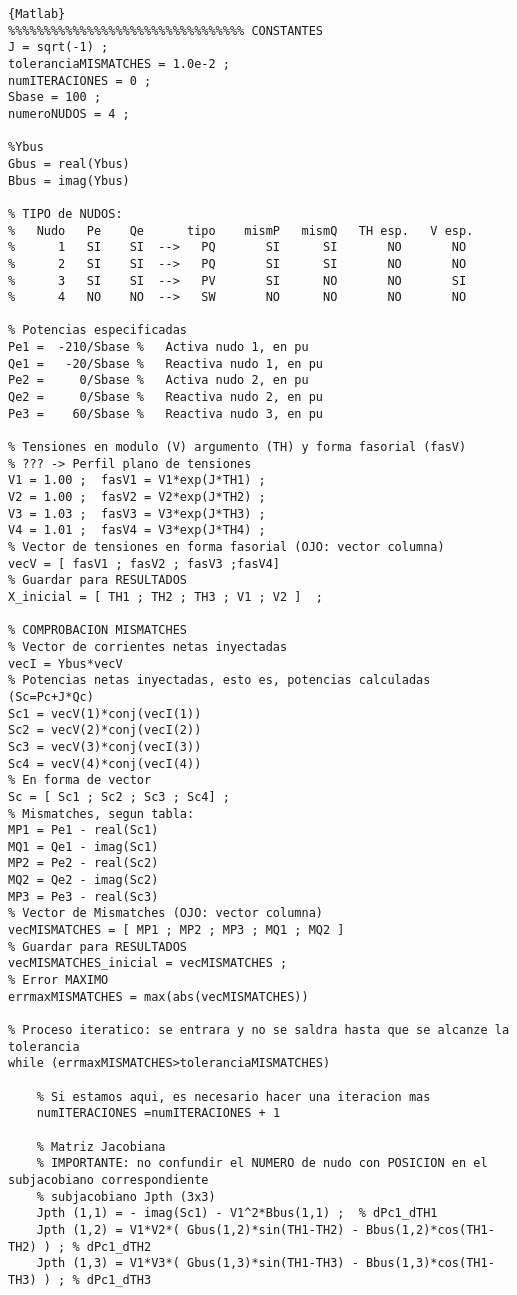 \documentclass[a4paper,10pt,titlepage,oneside]{article}
\begin{document}
{\begin{lstlisting}[frame=lines]{Matlab}
%%%%%%%%%%%%%%%%%%%%%%%%%%%%%%%%% CONSTANTES
J = sqrt(-1) ;
toleranciaMISMATCHES = 1.0e-2 ;
numITERACIONES = 0 ;
Sbase = 100 ;
numeroNUDOS = 4 ;

%Ybus
Gbus = real(Ybus)
Bbus = imag(Ybus)

% TIPO de NUDOS:
%   Nudo   Pe    Qe      tipo    mismP   mismQ   TH esp.   V esp.
%      1   SI    SI  -->   PQ       SI      SI       NO       NO
%      2   SI    SI  -->   PQ       SI      SI       NO       NO
%      3   SI    SI  -->   PV       SI      NO       NO       SI
%      4   NO    NO  -->   SW       NO      NO       NO       NO

% Potencias especificadas
Pe1 =  -210/Sbase %   Activa nudo 1, en pu
Qe1 =   -20/Sbase %   Reactiva nudo 1, en pu
Pe2 =     0/Sbase %   Activa nudo 2, en pu
Qe2 =     0/Sbase %   Reactiva nudo 2, en pu
Pe3 =    60/Sbase %   Reactiva nudo 3, en pu

% Tensiones en modulo (V) argumento (TH) y forma fasorial (fasV)
% ??? -> Perfil plano de tensiones
V1 = 1.00 ;  fasV1 = V1*exp(J*TH1) ;
V2 = 1.00 ;  fasV2 = V2*exp(J*TH2) ;
V3 = 1.03 ;  fasV3 = V3*exp(J*TH3) ;
V4 = 1.01 ;  fasV4 = V3*exp(J*TH4) ;
% Vector de tensiones en forma fasorial (OJO: vector columna)
vecV = [ fasV1 ; fasV2 ; fasV3 ;fasV4]  
% Guardar para RESULTADOS
X_inicial = [ TH1 ; TH2 ; TH3 ; V1 ; V2 ]  ;

% COMPROBACION MISMATCHES
% Vector de corrientes netas inyectadas
vecI = Ybus*vecV
% Potencias netas inyectadas, esto es, potencias calculadas (Sc=Pc+J*Qc)
Sc1 = vecV(1)*conj(vecI(1))
Sc2 = vecV(2)*conj(vecI(2))
Sc3 = vecV(3)*conj(vecI(3))
Sc4 = vecV(4)*conj(vecI(4))
% En forma de vector
Sc = [ Sc1 ; Sc2 ; Sc3 ; Sc4] ;
% Mismatches, segun tabla:
MP1 = Pe1 - real(Sc1)
MQ1 = Qe1 - imag(Sc1)
MP2 = Pe2 - real(Sc2)
MQ2 = Qe2 - imag(Sc2)
MP3 = Pe3 - real(Sc3)
% Vector de Mismatches (OJO: vector columna)
vecMISMATCHES = [ MP1 ; MP2 ; MP3 ; MQ1 ; MQ2 ]  
% Guardar para RESULTADOS
vecMISMATCHES_inicial = vecMISMATCHES ;
% Error MAXIMO
errmaxMISMATCHES = max(abs(vecMISMATCHES)) 

% Proceso iteratico: se entrara y no se saldra hasta que se alcanze la tolerancia
while (errmaxMISMATCHES>toleranciaMISMATCHES)
	
	% Si estamos aqui, es necesario hacer una iteracion mas
	numITERACIONES =numITERACIONES + 1 
	
	% Matriz Jacobiana
	% IMPORTANTE: no confundir el NUMERO de nudo con POSICION en el subjacobiano correspondiente
	% subjacobiano Jpth (3x3)
	Jpth (1,1) = - imag(Sc1) - V1^2*Bbus(1,1) ;  % dPc1_dTH1
	Jpth (1,2) = V1*V2*( Gbus(1,2)*sin(TH1-TH2) - Bbus(1,2)*cos(TH1-TH2) ) ; % dPc1_dTH2
    Jpth (1,3) = V1*V3*( Gbus(1,3)*sin(TH1-TH3) - Bbus(1,3)*cos(TH1-TH3) ) ; % dPc1_dTH3
    

\end{lstlisting}}
\end{document}
